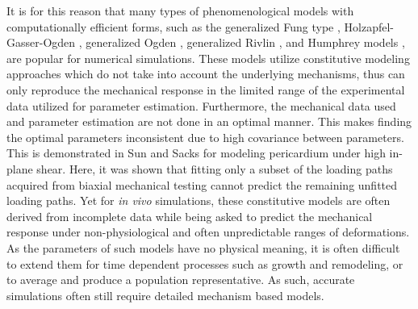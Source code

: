     It is for this reason that many types of phenomenological models with computationally efficient forms, such as the generalized Fung type \cite{fung_biomechanics_1993}, Holzapfel-Gasser-Ogden \cite{holzapfel_new_2000}, generalized Ogden \cite{ogden_large_1972}, generalized Rivlin \cite{rivlin_large_1951}, and Humphrey models \cite{may-newman_constitutive_1998}, are popular for numerical simulations. These models utilize constitutive modeling approaches which do not take into account the underlying mechanisms, thus can only reproduce the mechanical response in the limited range of the experimental data utilized for parameter estimation. Furthermore, the mechanical data used and parameter estimation are not done in an optimal manner. This makes finding the optimal parameters inconsistent due to high covariance between parameters. This is demonstrated in Sun and Sacks \cite{sun_biaxial_2003} for modeling pericardium under high in-plane shear. Here, it was shown that fitting only a subset of the loading paths acquired from biaxial mechanical testing cannot predict the remaining unfitted loading paths. Yet for \textit{in vivo} simulations, these constitutive models are often derived from incomplete data while being asked to predict the mechanical response under non-physiological and often unpredictable ranges of deformations. As the parameters of such models have no physical meaning, it is often difficult to extend them for time dependent processes such as growth and remodeling, or to average and produce a population representative. As such, accurate simulations often still require detailed mechanism based models. 
    

